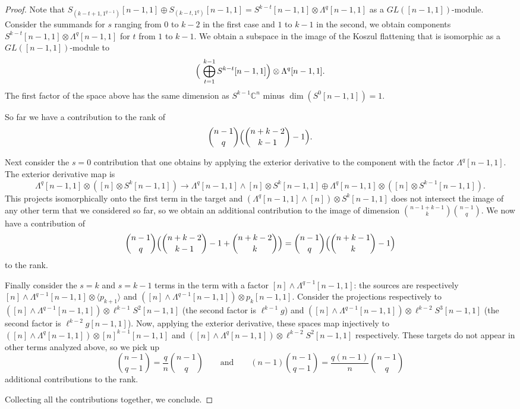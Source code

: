 \documentclass[11pt]{article}
\numberwithin{equation}{section}
\theoremstyle{definition}
\theoremstyle{plain}
\def\BC{\mathbb C}
\def\ww{\wedge}
\def\La#1{\Lambda^{#1}}
\def\tdim{\operatorname{dim}}
\begin{document}
\begin{proof}
Note that $S_{(k-t+1,1^{q-1})}[n-1,1]\oplus S_{(k-t,1^q)}[n-1,1]=S^{k-t}[n-1,1]\otimes \La{q}[n-1,1]$ as a $GL([n-1,1])$-module. Consider the summands for $s$ ranging from $0$ to $k-2 $ in the first case and $1$ to $k -1$ in the second, we obtain components $S^{k-t}[n-1,1]\otimes \La{q}[n-1,1]$ for $t$ from $1$ to $k-1$. We obtain a subspace in the image of the Koszul flattening that is isomorphic as a $GL([n-1,1])$-module to 
$$
\Bigl( \ \bigoplus_{t=1}^{k-1}S^{k-t}[n-1,1] \Bigr)\otimes \La{q}[n-1,1].
$$
The first factor of the space above has the same dimension as $S^{k-1}\BC^n$ minus $\tdim (S^0[n-1,1])=1$.

So far we have a contribution to the rank of
$$
\binom{n-1}{q} \Bigl( \binom{n+k-2}{k-1} - 1 \Bigr).
$$

Next consider the $s=0$ contribution that one obtains by applying the exterior derivative to the component with the factor $\Lambda^q [n-1,1]$. The exterior derivative map is
\[
  \La q [n-1,1]  \otimes ([n] \otimes S^k[n-1,1]) \to \La q [n-1,1]\ww [n]  \otimes S^k[n-1,1] \oplus  \Lambda^q [n-1,1] \otimes ([n]\otimes  S^{k-1}[n-1,1]).
\]
This projects isomorphically onto the first term in the target and
$(\La q [n-1,1]\ww [n]) \otimes S^k[n-1,1]$ does not intersect the
image of any other term that we considered so far, so we obtain an
additional contribution to the image of dimension
$\binom{n-1+k-1}{k}\binom{n-1}q$. We now have a contribution of
$$
\binom{n-1}q \Bigl(\binom{n+k-2}{k-1} - 1+ \binom{n+k-2}{k} \Bigr)=\binom{n-1}q \Bigl(\binom{n+k-1}{k } - 1\Bigr)  
$$
to the rank. 

Finally consider  the $s=k$ and $s=k-1$ terms in the term with a factor $[n] \wedge \Lambda^{q-1}[n-1,1]$: the sources are respectively $[n]\ww \La {q-1} [n-1,1] \otimes \langle p_{k+1} \rangle$ and $([n] \wedge \Lambda^{q-1} [n-1,1]) \otimes p_{k }[n-1,1]$. Consider the projections respectively to $([n]\ww \La {q-1} [n-1,1] )\otimes \ell^{k-1}S^2[n-1,1]$ (the second factor is $\ell^{k-1}g$) and $( [n]\ww \La {q-1} [n-1,1]) \otimes \ell^{k-2}S^3[n-1,1]$ (the second factor is $\ell^{k-2}g[n-1,1]$). Now, applying the exterior derivative, these spaces map injectively to $([n] \wedge \Lambda^{q}[n-1,1]) \otimes [n]^{k-1} [n-1,1]$ and $([n] \wedge \Lambda^{q}[n-1,1]) \otimes \ell^{k-2}S^2 [n-1,1]$ respectively. These targets do not appear in other terms analyzed above, so we pick up
\[
  \binom{n-1}{q-1}=\frac qn \binom{n-1}{q}\qquad\text{and}\qquad (n-1)\binom{n-1}{q-1}=\frac{q(n-1)}n\binom{n-1}q
\]
additional contributions to the rank.

Collecting all the contributions together, we conclude.
\end{proof}
\end{document}
